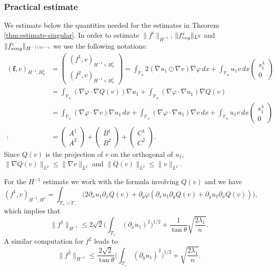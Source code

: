 \documentclass[11pt]{article}
\numberwithin{equation}{section}\newtheorem*{jepEnonce}{\jepEnonceTitle}\newenvironment{enonce*}[1]{\def\jepEnonceTitle{#1}\jepEnonce}{\endjepEnonce}\newtheorem*{conj*}{Conjecture}
\newcommand{\Psfrac}[2]{(\sfrac{#1}{#2})}
\theoremstyle{plain}
\theoremstyle{definition}
\newcommand{\bo}[1]{{\boldsymbol#1}}
\newcommand{\reg}{\textup{reg}}
\newcommand{\sing}{\textup{sing}}
\def\Pp{{\mathbb{P}_n}}
\let\jepOriginalSfrac\sfrac
\renewcommand{\sfrac}[2]{{\jepOriginalSfrac{#1}{#2}}}
\begin{document}
\subsubsection*{Practical estimate} We estimate below the quantities needed for the estimates in Theorem \ref{thm:estimate-singular}.
In order to estimate $\|f^i\|_{H^{-1}}$, $\|f^i_{\reg}\|_{L^2}$ and $\|f^i_{\sing}\|_{H^{-\Psfrac 12 -\gamma}}$ we use the following notations:
\begin{align*}
(\bo f,v)_{H^{-1},H_0^1}&=\begin{pmatrix} (f^1,v)_{H^{-1}\times H^1_0}\\ (f^2,v)_{H^{-1}\times H^1_0}\end{pmatrix} = \int_{\Pp} 2(\nabla u_1 \odot \nabla v)\nabla \varphi \, dx+ \int_{\Pp} u_1v\, dx \begin{pmatrix} s_1^\lambda\\ 0 \end{pmatrix} \\
&= \int_{\Pp} (\nabla \varphi \cdot \nabla Q(v))\nabla u_1 +\int_\Pp (\nabla \varphi \cdot \nabla u_1)\nabla Q(v)\\
&= \int_{\Pp} (\nabla \varphi \cdot \nabla v)\nabla u_1 \, dx+ \int_{\Pp} (\nabla \varphi \cdot \nabla u_1)\nabla v \, dx+\int_{\Pp} u_1v\, dx \begin{pmatrix} s_1^\lambda\\ 0 \end{pmatrix}\\
:\!&=\begin{pmatrix} A^1\\ A^2 \end{pmatrix}+\begin{pmatrix} B^1\\ B^2 \end{pmatrix}+\begin{pmatrix} C^1\\ C^2 \end{pmatrix}.
\end{align*}
Since $Q(v)$ is the projection of $v$ on the orthogonal of $u_1$, $\|\nabla Q(v)\|_{L^2} \leq \|\nabla v\|_{L^2}$ and $\|Q(v)\|_{L^2} \leq \|v\|_{L^2}$.

For the $H^{-1}$ estimate we work with the formula involving $Q(v)$ and we have
\[
(f^1,v)_{H^{-1},H^1} = \int_{T_+\cup T_-} \bigl(2\partial_x u_1 \partial_x Q(v) + \partial_y \varphi (\partial_x u_1 \partial_y Q(v) + \partial_y u_1 \partial_x Q(v))\bigr),
\]
which implies that
\[
\|f^1\|_{H^{-1}} \leq 2\sqrt{2} \biggl(\int_{T_+}(\partial_x u_1)^2\biggr)^{1/2}+\frac{1}{\tan \theta} \sqrt{\frac{2\lambda_1}{n}}.
\]
A similar computation for $f^2$ leads to
\[
\|f^2\|_{H^{-1}} \leq \frac{2\sqrt{2}}{\tan \theta}\biggl(\int_{T_+}(\partial_y u_1)^2\biggr)^{1/2} +\sqrt{\frac{2\lambda_1}{n}}.
\]
\end{document}
